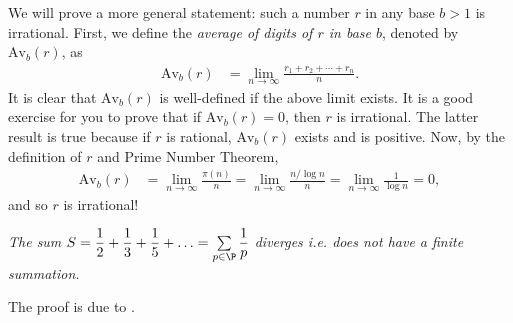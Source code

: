 \begin{solution}
	We will prove a more general statement: such a number $r$ in any base $b>1$ is irrational. First, we define the \textit{average of digits of $r$ in base $b$}, denoted by $\text{Av}_b(r)$, as
	\begin{align*}
	\text{Av}_b(r) &= \lim_{n\to \infty} \frac{r_1+r_2+\cdots+r_n}{n}.
	\end{align*}
	It is clear that $\text{Av}_b(r)$ is well-defined if the above limit exists. It is a good exercise for you to prove that if $\text{Av}_b(r)=0$, then $r$ is irrational. The latter result is true because if $r$ is rational, $\text{Av}_b(r)$ exists and is positive. Now, by the definition of $r$ and Prime Number Theorem,
	\begin{align*}
	\text{Av}_b(r) &= \lim_{n\to \infty} \frac{\pi(n)}{n} =  \lim_{n\to \infty} \frac{n/\log n}{n} =  \lim_{n\to \infty} \frac{1}{\log n} = 0,
	\end{align*}
	and so $r$ is irrational!
\end{solution}
	\begin{theorem}[Euler]\sl
		The sum $S=\dfrac{1}{2}+\dfrac{1}{3}+\dfrac{1}{5}+\ldots=\sum\limits_{p\in\P }\dfrac{1}{p}$ diverges i.e. does not have a finite summation.
	\end{theorem}
The proof is due to \textcite{mixon_2013}.
